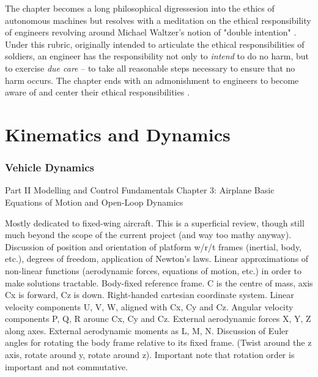 \documentclass[10pt]{article}
\begin{document}
The chapter becomes a long philosophical digressesion into the ethics of autonomous machines but resolves with a meditation on the ethical responsibility of engineers \cite[p.2873]{Valavanis2015j} revolving around Michael Waltzer's notion of "double intention" \cite{Waltzer}. Under this rubric, originally intended to articulate the ethical responsibilities of soldiers, an engineer has the responsibility not only to \emph{intend} to do no harm, but to exercise \emph{due care} -- to take all reasonable steps necessary to ensure that no harm occurs. The chapter ends with an admonishment to engineers to become aware of and center their ethical responsibilities \cite[p.2974]{Valavanis2015j}.

\section{Kinematics and Dynamics}

\subsubsection{Vehicle Dynamics}

\cite{Valavanis2007}

Part II Modelling and Control Fundamentals
Chapter 3: Airplane Basic Equations of Motion and Open-Loop Dynamics

Mostly dedicated to fixed-wing aircraft.
This is a superficial review, though still much beyond the scope of the current project (and way too mathy anyway).
Discussion of position and orientation of platform w/r/t frames (inertial, body, etc.), degrees of freedom, application of Newton’s laws.
Linear approximations of non-linear functions (aerodynamic forces, equations of motion, etc.) in order to make solutions tractable.
Body-fixed reference frame. C is the centre of mass, axis Cx is forward, Cz is down. Right-handed cartesian coordinate system.
Linear velocity components U, V, W, aligned with Cx, Cy and Cz.
Angular velocity components P, Q, R arounc Cx, Cy and Cz.
External aerodynamic forces X, Y, Z along axes. External aerodynamic moments as L, M, N.
Discussion of Euler angles for rotating the body frame relative to its fixed frame. (Twist around the z axis, rotate around y, rotate around z).
Important note that rotation order is important and not commutative.
\end{document}
